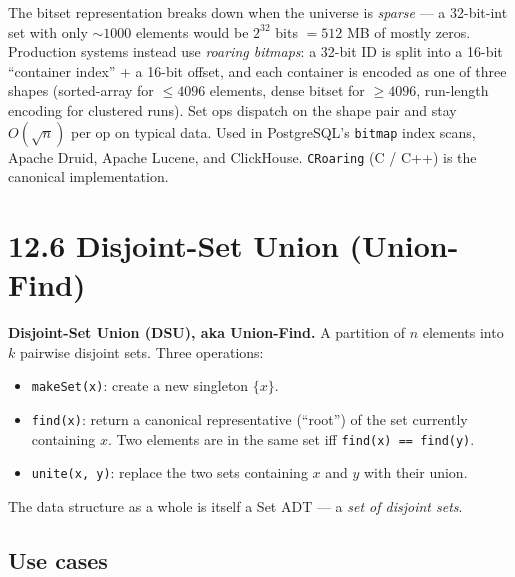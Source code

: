 \documentclass[11pt]{article}
\begin{document}
\begin{notebox}
The bitset representation breaks down when the universe is
\emph{sparse} --- a 32-bit-int set with only $\sim 1000$ elements
would be $2^{32}$ bits $= 512$ MB of mostly zeros. Production
systems instead use \emph{roaring bitmaps}: a 32-bit ID is split
into a 16-bit ``container index'' + a 16-bit offset, and each
container is encoded as one of three shapes (sorted-array for
$\le 4096$ elements, dense bitset for $\ge 4096$, run-length
encoding for clustered runs). Set ops dispatch on the shape pair
and stay $O(\sqrt{n})$ per op on typical data. Used in
PostgreSQL's \texttt{bitmap} index scans, Apache Druid, Apache
Lucene, and ClickHouse. \texttt{CRoaring} (C / C++) is the
canonical implementation.
\end{notebox}

\section{12.6 Disjoint-Set Union (Union-Find)}

\begin{defnbox}
\textbf{Disjoint-Set Union (DSU), aka Union-Find.} A partition of
$n$ elements into $k$ pairwise disjoint sets. Three operations:
\begin{itemize}[leftmargin=*]
    \item \texttt{makeSet(x)}: create a new singleton $\{x\}$.
    \item \texttt{find(x)}: return a canonical representative
          (``root'') of the set currently containing $x$.
          Two elements are in the same set iff
          \texttt{find(x) == find(y)}.
    \item \texttt{unite(x, y)}: replace the two sets containing
          $x$ and $y$ with their union.
\end{itemize}
The data structure as a whole is itself a Set ADT --- a
\emph{set of disjoint sets}.
\end{defnbox}

\subsection*{Use cases}
\end{document}
